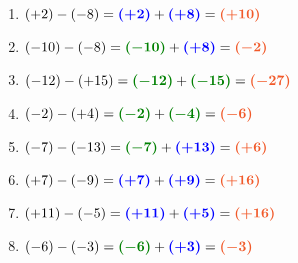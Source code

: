 \documentclass[a4paper,12pt]{report}
\begin{document}
\begin{Correction}
\begin{EXO}{}{}
\end{EXO}

\begin{EXO}{}{}
\begin{multicols}{2}

\begin{enumerate}[]
\item \begin{minipage}[t]{\linewidth}$ (+2) - (-8) = {\color{blue}\boldsymbol{(+2)}} + {\color{blue}\boldsymbol{(+8)}} = {\color[HTML]{F15929}\boldsymbol{(+10)}} $\end{minipage}
\item \begin{minipage}[t]{\linewidth}$ (-10) - (-8) = {\color[HTML]{008002}\boldsymbol{(-10)}} + {\color{blue}\boldsymbol{(+8)}} = {\color[HTML]{F15929}\boldsymbol{(-2)}} $\end{minipage}
\item \begin{minipage}[t]{\linewidth}$ (-12) - (+15) = {\color[HTML]{008002}\boldsymbol{(-12)}} + {\color[HTML]{008002}\boldsymbol{(-15)}} = {\color[HTML]{F15929}\boldsymbol{(-27)}} $\end{minipage}
\item \begin{minipage}[t]{\linewidth}$ (-2) - (+4) = {\color[HTML]{008002}\boldsymbol{(-2)}} + {\color[HTML]{008002}\boldsymbol{(-4)}} = {\color[HTML]{F15929}\boldsymbol{(-6)}} $\end{minipage}
\item \begin{minipage}[t]{\linewidth}$ (-7) - (-13) = {\color[HTML]{008002}\boldsymbol{(-7)}} + {\color{blue}\boldsymbol{(+13)}} = {\color[HTML]{F15929}\boldsymbol{(+6)}} $\end{minipage}
\item \begin{minipage}[t]{\linewidth}$ (+7) - (-9) = {\color{blue}\boldsymbol{(+7)}} + {\color{blue}\boldsymbol{(+9)}} = {\color[HTML]{F15929}\boldsymbol{(+16)}} $\end{minipage}
\item \begin{minipage}[t]{\linewidth}$ (+11) - (-5) = {\color{blue}\boldsymbol{(+11)}} + {\color{blue}\boldsymbol{(+5)}} = {\color[HTML]{F15929}\boldsymbol{(+16)}} $\end{minipage}
\item \begin{minipage}[t]{\linewidth}$ (-6) - (-3) = {\color[HTML]{008002}\boldsymbol{(-6)}} + {\color{blue}\boldsymbol{(+3)}} = {\color[HTML]{F15929}\boldsymbol{(-3)}} $\end{minipage}

\end{enumerate}
\end{multicols}
\end{EXO}
\end{Correction}
\end{document}

